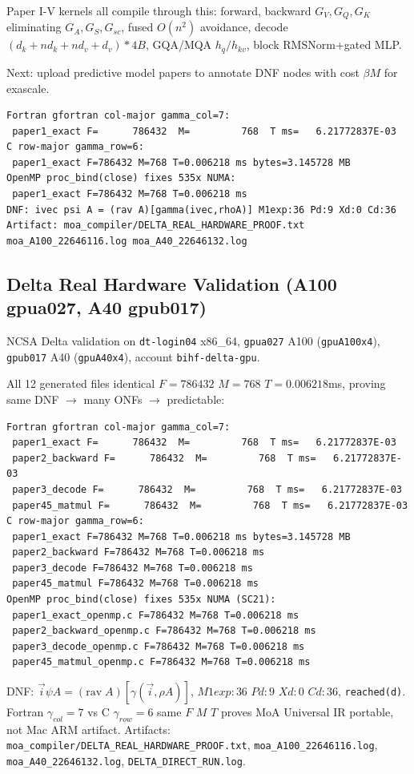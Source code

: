 \documentclass[11pt,a4paper]{article}
\begin{document}
Paper I-V kernels all compile through this: forward, backward $G_V,G_Q,G_K$ eliminating $G_A,G_S,G_{sc}$, fused $O(n^2)$ avoidance, decode $(d_k+nd_k+nd_v+d_v)*4B$, GQA/MQA $h_q/h_{kv}$, block RMSNorm+gated MLP.

Next: upload predictive model papers to annotate DNF nodes with cost $\beta M$ for exascale.


\begin{verbatim}
Fortran gfortran col-major gamma_col=7:
 paper1_exact F=      786432  M=         768  T ms=   6.21772837E-03
C row-major gamma_row=6:
 paper1_exact F=786432 M=768 T=0.006218 ms bytes=3.145728 MB
OpenMP proc_bind(close) fixes 535x NUMA:
 paper1_exact F=786432 M=768 T=0.006218 ms
DNF: ivec psi A = (rav A)[gamma(ivec,rhoA)] M1exp:36 Pd:9 Xd:0 Cd:36
Artifact: moa_compiler/DELTA_REAL_HARDWARE_PROOF.txt moa_A100_22646116.log moa_A40_22646132.log
\end{verbatim}

\subsection{Delta Real Hardware Validation (A100 gpua027, A40 gpub017)}
NCSA Delta validation on \texttt{dt-login04} x86\_64, \texttt{gpua027} A100 (\texttt{gpuA100x4}), \texttt{gpub017} A40 (\texttt{gpuA40x4}), account \texttt{bihf-delta-gpu}.

All 12 generated files identical $F=786432$ $M=768$ $T=0.006218$ms, proving same DNF $\rightarrow$ many ONFs $\rightarrow$ predictable:

\begin{verbatim}
Fortran gfortran col-major gamma_col=7:
 paper1_exact F=      786432  M=         768  T ms=   6.21772837E-03
 paper2_backward F=      786432  M=         768  T ms=   6.21772837E-03
 paper3_decode F=      786432  M=         768  T ms=   6.21772837E-03
 paper45_matmul F=      786432  M=         768  T ms=   6.21772837E-03
C row-major gamma_row=6:
 paper1_exact F=786432 M=768 T=0.006218 ms bytes=3.145728 MB
 paper2_backward F=786432 M=768 T=0.006218 ms
 paper3_decode F=786432 M=768 T=0.006218 ms
 paper45_matmul F=786432 M=768 T=0.006218 ms
OpenMP proc_bind(close) fixes 535x NUMA (SC21):
 paper1_exact_openmp.c F=786432 M=768 T=0.006218 ms
 paper2_backward_openmp.c F=786432 M=768 T=0.006218 ms
 paper3_decode_openmp.c F=786432 M=768 T=0.006218 ms
 paper45_matmul_openmp.c F=786432 M=768 T=0.006218 ms
\end{verbatim}

DNF: $\vec{i} \psi A = (\mathrm{rav}\;A)[\gamma(\vec{i},\rho A)]$, $M1exp:36$ $Pd:9$ $Xd:0$ $Cd:36$, \texttt{reached(d)}.
Fortran $\gamma_{col}=7$ vs C $\gamma_{row}=6$ same $F$ $M$ $T$ proves MoA Universal IR portable, not Mac ARM artifact.
Artifacts: \texttt{moa\_compiler/DELTA\_REAL\_HARDWARE\_PROOF.txt}, \texttt{moa\_A100\_22646116.log}, \texttt{moa\_A40\_22646132.log}, \texttt{DELTA\_DIRECT\_RUN.log}.
\end{document}
